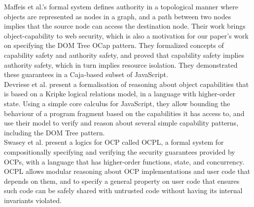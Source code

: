 \documentclass[a4paper,11pt,twoside]{article}
\begin{document}
Maffeis et al.\cite{maffeis2010}'s formal system defines authority in a topological manner where objects are represented as nodes in a graph, and a path between two nodes implies that the source node can access the destination node. Their work brings object-capability to web security, which is also a motivation for our paper's work on specifying the DOM Tree OCap pattern. They formalized concepts of capability safety and authority safety, and proved that capability safety implies authority safety, which in turn implies resource isolation. They demonstrated these guarantees in a Caja-based subset of JavaScript.\\

Devriese et al.\cite{devriese2016} present a formalisation of reasoning about object capabilities that is based on a Kripke logical relations model, in a language with higher-order state. Using a simple core calculus for JavaScript, they allow bounding the behaviour of a program fragment based on the capabilities it has access to, and use their model to verify and reason about several simple capability patterns, including the DOM Tree pattern. \\

Swasey et al.\cite{swasey2017} present a logics for OCP called OCPL, a formal system for compositionally specifying and verifying the security guarantees provided by OCPs, with a language that has higher-order functions, state, and concurrency. OCPL allows modular reasoning about OCP implementations and user code that depends on them, and to specify a general property on user code that ensures such code can be safely shared with untrusted code without having its internal invariants violated.

\newpage
\end{document}
